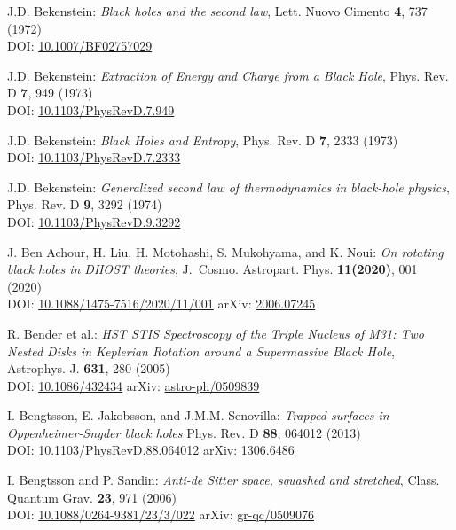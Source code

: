 \begin{thebibliography}{123}
J.D. Bekenstein:
{\em Black holes and the second law},
Lett. Nuovo Cimento {\bf 4}, 737 (1972)\\
DOI: \href{https://doi.org/10.1007/BF02757029}{10.1007/BF02757029}

J.D. Bekenstein:
{\em Extraction of Energy and Charge from a Black Hole},
Phys. Rev. D {\bf 7}, 949 (1973)\\
DOI: \href{https://doi.org/10.1103/PhysRevD.7.949}{10.1103/PhysRevD.7.949}

J.D. Bekenstein:
{\em Black Holes and Entropy},
Phys. Rev. D {\bf 7}, 2333 (1973)\\
DOI: \href{https://doi.org/10.1103/PhysRevD.7.2333}{10.1103/PhysRevD.7.2333}

J.D. Bekenstein:
{\em Generalized second law of thermodynamics in black-hole physics},
Phys. Rev. D {\bf 9}, 3292 (1974)\\
DOI: \href{https://doi.org/10.1103/PhysRevD.9.3292}{10.1103/PhysRevD.9.3292}

J. Ben Achour, H. Liu, H. Motohashi, S. Mukohyama, and K. Noui:
{\em On rotating black holes in DHOST theories},
J.~Cosmo. Astropart. Phys. {\bf 11(2020)}, 001 (2020)\\
DOI: \href{https://doi.org/10.1088/1475-7516/2020/11/001}{10.1088/1475-7516/2020/11/001}\hfill
arXiv: \href{https://arxiv.org/abs/2006.07245}{2006.07245}

R. Bender et al.:
{\em HST STIS Spectroscopy of the Triple Nucleus of M31: Two Nested Disks in Keplerian Rotation around a Supermassive Black Hole},
Astrophys. J. {\bf 631}, 280 (2005)\\
DOI: \href{https://doi.org/10.1086/432434}{10.1086/432434}\hfill
arXiv: \href{https://arxiv.org/abs/astro-ph/0509839}{astro-ph/0509839}

I. Bengtsson, E. Jakobsson, and J.M.M. Senovilla:
{\em Trapped surfaces in Oppenheimer-Snyder black holes}
Phys. Rev. D {\bf 88}, 064012 (2013)\\
DOI: \href{https://doi.org/10.1103/PhysRevD.88.064012}{10.1103/PhysRevD.88.064012}\hfill
arXiv: \href{https://arxiv.org/abs/1306.6486}{1306.6486}

I. Bengtsson and P. Sandin:
{\em Anti-de Sitter space, squashed and stretched},
Class. Quantum Grav. {\bf 23}, 971 (2006)\\
DOI: \href{https://doi.org/10.1088/0264-9381/23/3/022}{10.1088/0264-9381/23/3/022}\hfill
arXiv: \href{https://arxiv.org/abs/gr-qc/0509076}{gr-qc/0509076}


\end{thebibliography}
